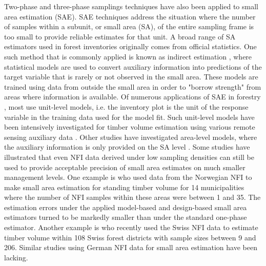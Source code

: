 Two-phase and three-phase samplings techniques have also been applied to small area estimation (SAE). SAE techniques address the situation where the number of samples within a subunit, or small area (SA), of the entire sampling frame is too small to provide reliable estimates for that unit. A broad range of SA estimators used in forest inventories \citep{kohl2006} originally comes from official statistics. One such method that is commonly applied is known as indirect estimation \citep{rao2015}, where statistical models are used to convert auxiliary information into predictions of the target variable that is rarely or not observed in the small area. These models are trained using data from outside the small area in order to "borrow strength" from areas where information is available. Of numerous applications of SAE in forestry \citep{breidenbach2012, goerndt2011, steinmann2013, mandallaz2013b}, most use unit-level models, i.e. the inventory plot is the unit of the response variable in the training data used for the model fit. Such unit-level models have been intensively investigated for timber volume estimation using various remote sensing auxiliary data \citep{koch2010, naesset2014inmaltamo}. Other studies have investigated area-level models, where the auxiliary information is only provided on the SA level \citep{magnussen2017}. Some studies have illustrated that even NFI data derived under low sampling densities can still be used to provide acceptable precision of small area estimates on much smaller management levels. One example is \citet{breidenbach2012} who used data from the Norwegian NFI to make small area estimation for standing timber volume for 14 municipalities where the number of NFI samples within these areas were between 1 and 35. The estimation errors under the applied model-based and design-based small area estimators turned to be markedly smaller than under the standard one-phase estimator. Another example is \citet{magnussen2014} who recently used the Swiss NFI data to estimate timber volume within 108 Swiss forest districts with sample sizes between 9 and 206. Similar studies using German NFI data for small area estimation have been lacking.\par

